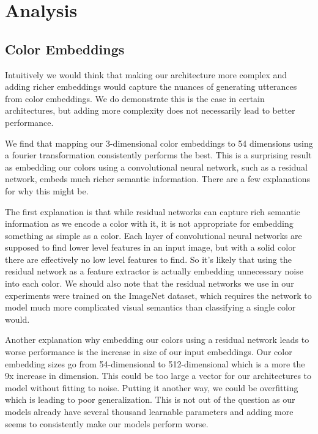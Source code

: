 \section{Analysis}

\subsection{Color Embeddings}

Intuitively we would think that making our architecture more complex and adding richer embeddings would capture the nuances of generating utterances from color embeddings. We do demonstrate this is the case in certain architectures, but adding more complexity does not necessarily lead to better performance.

\par
We find that mapping our 3-dimensional color embeddings to 54 dimensions using a fourier transformation consistently performs the best. This is a surprising result as embedding our colors using a convolutional neural network, such as a residual network, embeds much richer semantic information. There are a few explanations for why this might be.

\par
The first explanation is that while residual networks can capture rich semantic information as we encode a color with it, it is not appropriate for embedding something as simple as a color. Each layer of convolutional neural networks are supposed to find lower level features in an input image, but with a solid color there are effectively no low level features to find. So it’s likely that using the residual network as a feature extractor is actually embedding unnecessary noise into each color. We should also note that the residual networks we use in our experiments were trained on the ImageNet dataset, which requires the network to model much more complicated visual semantics than classifying a single color would.

\par
Another explanation why embedding our colors using a residual network leads to worse performance is the increase in size of our input embeddings. Our color embedding sizes go from 54-dimensional to 512-dimensional which is a more the 9x increase in dimension. This could be too large a vector for our architectures to model without fitting to noise. Putting it another way, we could be overfitting which is leading to poor generalization. This is not out of the question as our models already have several thousand learnable parameters and adding more seems to consistently make our models perform worse.

